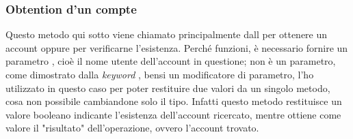 \documentclass{article}
\begin{document}
\subsubsection{Obtention d'un compte}

Questo metodo qui sotto viene chiamato principalmente dall  per ottenere un account oppure per verificarne l'esistenza. Perché funzioni, è necessario fornire un parametro , cioè il nome utente dell'account in questione;  non è un parametro, come dimostrato dalla \textit{keyword} , bensi un modificatore di parametro, l'ho utilizzato in questo caso per poter restituire due valori da un singolo metodo, cosa non possibile cambiandone solo il tipo. Infatti questo metodo restituisce un valore booleano indicante l'esistenza dell'account ricercato, mentre  ottiene come valore il "risultato" dell'operazione, ovvero l'account trovato.
\end{document}
